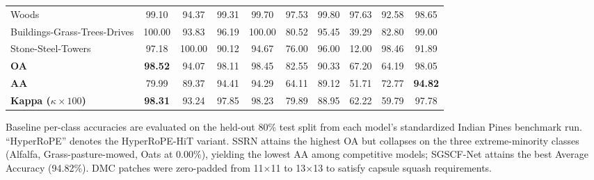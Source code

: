 \documentclass[manuscript,screen,review]{acmart}
\begin{document}
\begin{table}[tbp]
\begin{tabular}{p{3.0cm}ccccccccc}
Woods                        & 99.10 & 94.37 & 99.31 & 99.70 & 97.53 & 99.80 & 97.63 & 92.58 & 98.65 \\
Buildings-Grass-Trees-Drives & 100.00 & 93.83 & 96.19 & 100.00 & 80.52 & 95.45 & 39.29 & 82.80 & 99.00 \\
Stone-Steel-Towers           & 97.18 & 100.00 & 90.12 & 94.67 & 76.00 & 96.00 & 12.00 & 98.46 & 91.89 \\
\midrule
\textbf{OA}          & \textbf{98.52} & 94.07 & 98.11 & 98.45 & 82.55 & 90.33 & 67.20 & 64.19 & 98.05 \\
\textbf{AA}          & 79.99 & 89.37 & 94.41 & 94.29 & 64.11 & 89.12 & 51.71 & 72.77 & \textbf{94.82} \\
\textbf{Kappa ($\kappa\times100$)} & \textbf{98.31} & 93.24 & 97.85 & 98.23 & 79.89 & 88.95 & 62.22 & 59.79 & 97.78 \\
\bottomrule
\end{tabular}
\flushleft
\footnotesize{Baseline per-class accuracies are evaluated on the held-out 80\% test split from each model's standardized Indian Pines benchmark run. ``HyperRoPE'' denotes the HyperRoPE-HiT variant. SSRN attains the highest OA but collapses on the three extreme-minority classes (Alfalfa, Grass-pasture-mowed, Oats at 0.00\%), yielding the lowest AA among competitive models; SGSCF-Net attains the best Average Accuracy (94.82\%). DMC patches were zero-padded from 11$\times$11 to 13$\times$13 to satisfy capsule squash requirements.}
\end{table}
\end{document}
